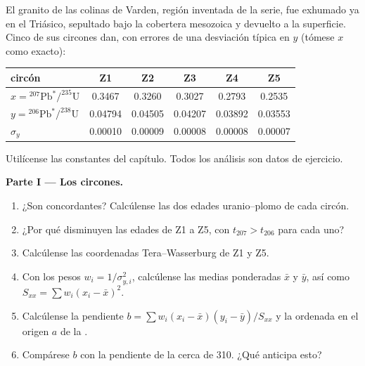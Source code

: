 \begin{problem}\label{pb:b3:advanced-geochronology:1}
El granito de las colinas de Varden, región inventada de la serie, fue
exhumado ya en el Triásico, sepultado bajo la cobertera mesozoica y devuelto a la
superficie. Cinco de sus circones dan, con errores de una desviación típica en $y$
(tómese $x$ como exacto):
\begin{center}
\small
\begin{tabular}{|l|ccccc|}
\hline
circón & Z1 & Z2 & Z3 & Z4 & Z5 \\
\hline
$x = {}^{207}\mathrm{Pb}^*/^{235}\mathrm U$ & 0.3467 & 0.3260 & 0.3027 & 0.2793 & 0.2535 \\
$y = {}^{206}\mathrm{Pb}^*/^{238}\mathrm U$ & 0.04794 & 0.04505 & 0.04207 & 0.03892 & 0.03553 \\
$\sigma_y$ & 0.00010 & 0.00009 & 0.00008 & 0.00008 & 0.00007 \\
\hline
\end{tabular}
\end{center}
Utilícense las constantes del capítulo. Todos los análisis son datos de ejercicio.

\medskip\noindent\textbf{Parte I --- Los circones.}
\begin{enumerate}
\item ¿Son concordantes? Calcúlense las dos edades uranio--plomo de cada circón.
\item ¿Por qué disminuyen las edades de Z1 a Z5, con $t_{207} > t_{206}$ para
cada uno?
\item Calcúlense las coordenadas Tera--Wasserburg de Z1 y Z5.
\item Con los pesos $w_i = 1/\sigma_{y,i}^2$, calcúlense las medias ponderadas
$\bar x$ y $\bar y$, así como $S_{xx} = \sum w_i(x_i - \bar x)^2$.
\item Calcúlense la pendiente $b = \sum w_i(x_i - \bar x)(y_i - \bar y)/S_{xx}$ y
la ordenada en el origen $a$ de la .
\item Compárese $b$ con la pendiente de la  cerca de \qty{310}{\Ma}. ¿Qué
anticipa esto?
\end{enumerate}


\end{problem}

